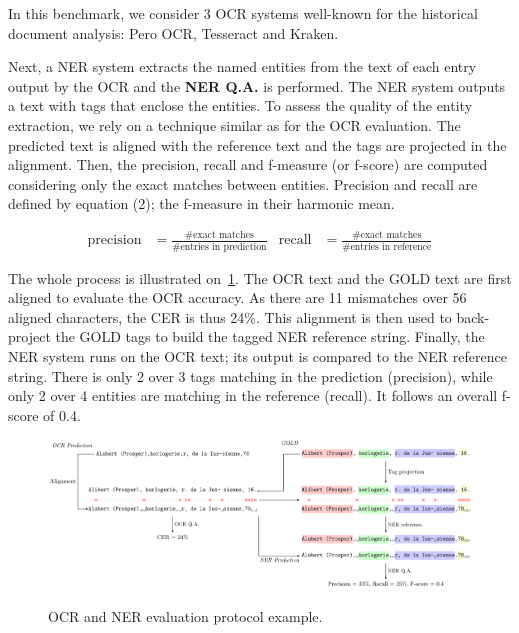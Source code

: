 In this benchmark, we consider 3 OCR systems well-known for the historical document analysis: Pero OCR, Tesseract and Kraken. 



Next, a NER system extracts the named entities from the text of each entry output by the OCR and the \textbf{NER Q.A.}
is performed. The NER system outputs a text with tags that enclose the entities. To assess the quality of the entity
extraction, we rely on a technique similar as for the OCR evaluation. The predicted text is aligned with the reference
text and the tags are projected in the alignment. Then, the precision, recall and f-measure (or f-score) are computed considering
only the exact matches between entities. Precision and recall are defined by equation (2); the f-measure in their harmonic mean.

\begin{align}
    \mathrm{precision} &= \frac{\text{\#exact matches}}{\text{\#entries in prediction}} & \mathrm{recall} &= \frac{\text{\#exact matches}}{\text{\#entries in reference}}
\end{align}


The whole process is illustrated on~\cref{fig.eval-ocr-ner}. The OCR text and the GOLD text are first aligned to
evaluate the OCR accuracy. As there are 11 mismatches over 56 aligned characters, the CER is thus 24\%. This alignment
is then used to back-project the GOLD tags to build the tagged NER reference string. Finally, the NER system runs on the
OCR text; its output is compared to the NER reference string. There is only 2 over 3 tags matching in the prediction (precision),
while only 2 over 4 entities are matching in the reference (recall). It follows an overall f-score of 0.4.


\begin{figure}[tb]
    \includegraphics[width=\linewidth]{figs/eval-ocr-ner.pdf}
    \label{fig.eval-ocr-ner}
    \caption{OCR and NER evaluation protocol example.}
\end{figure}



